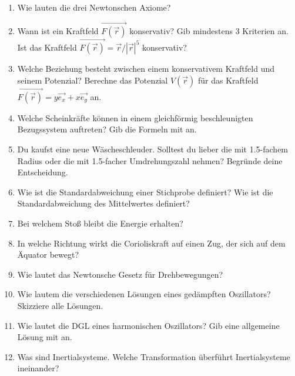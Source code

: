 




\begin{enumerate}
  \item Wie lauten die drei Newtonschen Axiome?
  \item Wann ist ein Kraftfeld $\vec{F(\vec{r})}$ konservativ? Gib mindestens 3 Kriterien
  an. Ist das Kraftfeld $\vec{F(\vec{r})} = \vec{r}/|\vec{r}|^5$ konservativ?
  \item Welche Beziehung besteht zwischen einem konservativem Kraftfeld und seinem
  Potenzial? Berechne das Potenzial $V(\vec{r})$ für das Kraftfeld $\vec{F(\vec{r})}
  = y\vec{e_x} + x\vec{e_y}$ an.
  \item Welche Scheinkräfte können in einem gleichförmig beschleunigten Bezugssystem
  auftreten? Gib die Formeln mit an.
  \item Du kaufst eine neue Wäscheschleuder. Solltest du lieber die mit 1.5-fachem
  Radius oder die mit 1.5-facher Umdrehungszahl nehmen? Begründe deine Entscheidung.
  \item Wie ist die Standardabweichung einer Stichprobe definiert? Wie ist die
  Standardabweichung des Mittelwertes definiert?
  \item Bei welchem Stoß bleibt die Energie erhalten?
  \item In welche Richtung wirkt die Corioliskraft auf einen Zug, der sich auf
  dem Äquator bewegt?
  \item Wie lautet das Newtonsche Gesetz für Drehbewegungen?
  \item Wie lautem die verschiedenen Lösungen eines gedämpften Oszillators?
  Skizziere alle Lösungen.
  \item Wie lautet die DGL eines harmonischen Oszillators? Gib eine allgemeine
  Lösung mit an.
  \item Was sind Inertialsysteme. Welche Transformation überführt Inertialsysteme
  ineinander?
\end{enumerate}


